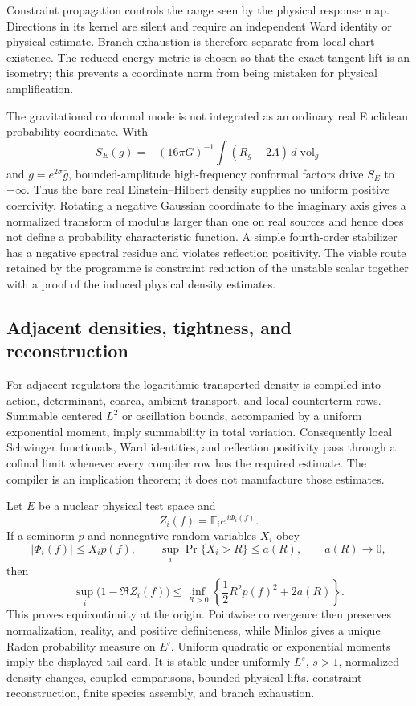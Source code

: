 \documentclass[11pt]{article}
\begin{document}
Constraint propagation controls the range seen by the physical response
map.  Directions in its kernel are silent and require an independent Ward
identity or physical estimate.  Branch exhaustion is therefore separate
from local chart existence.  The reduced energy metric is chosen so that
the exact tangent lift is an isometry; this prevents a coordinate norm
from being mistaken for physical amplification.

The gravitational conformal mode is not integrated as an ordinary real
Euclidean probability coordinate.  With
\[
 S_E(g)=-(16\pi G)^{-1}\int (R_g-2\Lambda)\,d\operatorname{vol}_g
\]
and \(g=e^{2\sigma}\bar g\), bounded-amplitude high-frequency conformal
factors drive \(S_E\) to \(-\infty\).  Thus the bare real
Einstein--Hilbert density supplies no uniform positive coercivity.
Rotating a negative Gaussian coordinate to the imaginary axis gives a
normalized transform of modulus larger than one on real sources and hence
does not define a probability characteristic function.  A simple
fourth-order stabilizer has a negative spectral residue and violates
reflection positivity.  The viable route retained by the programme is
constraint reduction of the unstable scalar together with a proof of the
induced physical density estimates.

\subsection{Adjacent densities, tightness, and reconstruction}

For adjacent regulators the logarithmic transported density is compiled
into action, determinant, coarea, ambient-transport, and local-counterterm
rows.  Summable centered \(L^2\) or oscillation bounds, accompanied by a
uniform exponential moment, imply summability in total variation.
Consequently local Schwinger functionals, Ward identities, and reflection
positivity pass through a cofinal limit whenever every compiler row has
the required estimate.  The compiler is an implication theorem; it does
not manufacture those estimates.

Let \(E\) be a nuclear physical test space and
\[
 Z_i(f)=\mathbb E_i e^{\,i\Phi_i(f)}.
\]
If a seminorm \(p\) and nonnegative random variables \(X_i\) obey
\[
 |\Phi_i(f)|\leq X_i p(f),\qquad
 \sup_i\Pr\{X_i>R\}\leq a(R),\qquad a(R)\longrightarrow0,
\]
then
\[
 \sup_i\bigl(1-\Re Z_i(f)\bigr)
 \leq
 \inf_{R>0}\left\{\frac12R^2p(f)^2+2a(R)\right\}.
\]
This proves equicontinuity at the origin.  Pointwise convergence then
preserves normalization, reality, and positive definiteness, while
Minlos gives a unique Radon probability measure on \(E'\).
Uniform quadratic or exponential moments imply the displayed tail card.
It is stable under uniformly \(L^s\), \(s>1\), normalized density changes,
coupled comparisons, bounded physical lifts, constraint reconstruction,
finite species assembly, and branch exhaustion.
\end{document}
